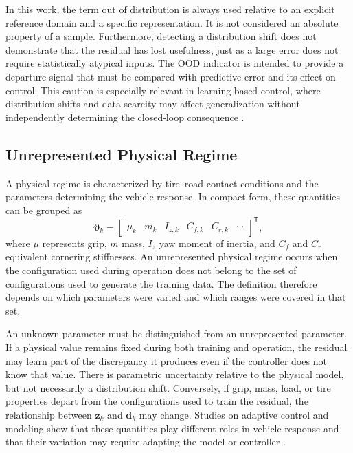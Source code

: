 \documentclass[12pt,a4paper]{report}
\begin{document}
In this work, the term out of distribution is always used relative to an explicit reference domain and a specific representation. It is not considered an absolute property of a sample. Furthermore, detecting a distribution shift does not demonstrate that the residual has lost usefulness, just as a large error does not require statistically atypical inputs. The OOD indicator is intended to provide a departure signal that must be compared with predictive error and its effect on control. This caution is especially relevant in learning-based control, where distribution shifts and data scarcity may affect generalization without independently determining the closed-loop consequence \cite{Brunke2022Safe}.

\subsection{Unrepresented Physical Regime}
\label{sec:regimen_fisico_no_representado}


A physical regime is characterized by tire--road contact conditions and the parameters determining the vehicle response. In compact form, these quantities can be grouped as
\begin{equation}
    \boldsymbol{\vartheta}_k
    =
    \begin{bmatrix}
        \mu_k & m_k & I_{z,k} & C_{f,k} & C_{r,k} & \cdots
    \end{bmatrix}^{\mathsf T},
    \label{eq:physical_regime_vector}
\end{equation}
where $\mu$ represents grip, $m$ mass, $I_z$ yaw moment of inertia, and $C_f$ and $C_r$ equivalent cornering stiffnesses. An unrepresented physical regime occurs when the configuration used during operation does not belong to the set of configurations used to generate the training data. The definition therefore depends on which parameters were varied and which ranges were covered in that set.

An unknown parameter must be distinguished from an unrepresented parameter. If a physical value remains fixed during both training and operation, the residual may learn part of the discrepancy it produces even if the controller does not know that value. There is parametric uncertainty relative to the physical model, but not necessarily a distribution shift. Conversely, if grip, mass, load, or tire properties depart from the configurations used to train the residual, the relationship between $\mathbf{z}_k$ and $\mathbf{d}_k$ may change. Studies on adaptive control and modeling show that these quantities play different roles in vehicle response and that their variation may require adapting the model or controller \cite{Yeneneh2026AutoDyn,Kalaria2024Adaptive,Zhou2025Hybrid}.
\end{document}
